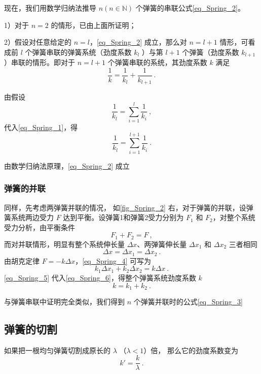 现在，我们用数学归纳法推导 $n(n\in \mathbb N)$ 个弹簧的串联公式\autoref{eq_Spring_2}。

1）对于 $n=2$ 的情形，已由上面所证明；

2）假设对任意给定的 $n=l$，\autoref{eq_Spring_2} 成立，那么对 $n=l+1$ 情形，可看成前 $l$ 个弹簧串联的弹簧系统（劲度系数 $k_l$ ）与第 $l+1$ 个弹簧（劲度系数 $ k_{l+1}$ ）串联的情形。即对于 $n=l+1$ 个弹簧串联的系统，其劲度系数 $k$ 满足
\begin{equation}\label{eq_Spring_1}
\frac{1}{k}=\frac{1}{k_l}+\frac{1}{k_{l+1}}~.
\end{equation}

由假设
\begin{equation}
\frac{1}{k_l}=\sum\limits_{i=1}^{l}\frac{1}{k_i}~,
\end{equation}
代入\autoref{eq_Spring_1}，得
\begin{equation}
\frac{1}{k_l}=\sum\limits_{i=1}^{l+1}\frac{1}{k_i}~.
\end{equation}

由数学归纳法原理，\autoref{eq_Spring_2} 成立
\subsubsection{弹簧的并联}
同样，先考虑两弹簧并联的情况，
如\autoref{fig_Spring_2} 右，对于弹簧的并联，设弹簧系统两边受力 $F$ 达到平衡。设弹簧1和弹簧2受力分别为 $F_1$ 和 $F_2$，对整个系统受力分析，由平衡条件
\begin{equation}
F_1+F_2=F~,
\end{equation}
而对并联情形，明显有整个系统伸长量 $\Delta x$、两弹簧伸长量 $\Delta x_1$ 和 $\Delta x_2$ 三者相同
\begin{equation}\label{eq_Spring_5}
\Delta x=\Delta x_1=\Delta x_2~.
\end{equation}
由胡克定律 $F=-k\Delta x$，\autoref{eq_Spring_4} 可写为
\begin{equation}\label{eq_Spring_6}
k_1\Delta x_1+k_2\Delta x_2=k\Delta x~.
\end{equation}
\autoref{eq_Spring_5} 代入\autoref{eq_Spring_6}，得整个弹簧系统劲度系数 $k$
\begin{equation}
k=k_1+k_2~.
\end{equation}

与弹簧串联中证明完全类似，我们得到 $n$ 个弹簧并联时的公式\autoref{eq_Spring_3} 

\subsection{弹簧的切割}
如果把一根均匀弹簧切割成原长的 $\lambda$ （$\lambda < 1$）倍， 那么它的劲度系数变为
\begin{equation}\label{eq_Spring_4}
k' = \frac{k}{\lambda}~.
\end{equation}

